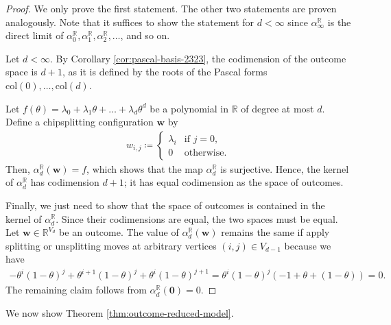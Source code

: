 \begin{proof}
    We only prove the first statement. The other two statements are proven analogously. Note that it suffices to show the statement for \( d < \infty \) since \( \alpha_\infty^\mathbb{R} \) is the direct limit of \( \alpha^{\mathbb R}_0, \alpha^{\mathbb R}_1, \alpha^{\mathbb R}_2, \dots \), and so on.

    Let \( d < \infty \). By Corollary \ref{cor:pascal-basis-2323}, the codimension of the outcome space is \( d+1 \), as it is defined by the roots of the Pascal forms \( \mathrm{col}(0), \dots, \mathrm{col}(d) \). 

    Let \( f(\theta) = \lambda_0 + \lambda_1 \theta + \dots + \lambda_d \theta^d  \) be a polynomial in \( \mathbb R \) of degree at most \( d \). Define a chipsplitting configuration \( \mathbf{w} \) by 
        \begin{align*}
            w_{i,j} \coloneqq \begin{cases}
                \lambda_i & \text{if } j=0, \\
                0 & \text{otherwise}.
            \end{cases}
        \end{align*}
    Then, \( \alpha^\mathbb{R}_d(\mathbf w) = f \), which shows that the map \( \alpha^{\mathbb R}_d \) is surjective. Hence, the kernel of \( \alpha^{\mathbb R}_d \) has codimension \( d+1 \); it has equal codimension as the space of outcomes. 

    Finally, we just need to show that the space of outcomes is contained in the kernel of \( \alpha^{\mathbb R}_d \). Since their codimensions are equal, the two spaces must be equal. Let \( \mathbf{w} \in \mathbb{R}^{V_d} \) be an outcome. The value of \( \alpha^{\mathbb R}_d(\mathbf w) \) remains the same if apply splitting or unsplitting moves at arbitrary vertices \( (i,j) \in V_{d-1} \) because we have 
    \begin{align*}
        -\theta^i(1-\theta)^j + \theta^{i+1}(1-\theta)^j + \theta^i(1-\theta)^{j+1} = \theta^i(1-\theta)^j (-1 + \theta + (1 - \theta)) = 0.
    \end{align*}
    The remaining claim follows from \( \alpha_d^{\mathbb{R}}(\mathbf 0) = 0 \).
\end{proof}

We now show Theorem \ref{thm:outcome-reduced-model}.


